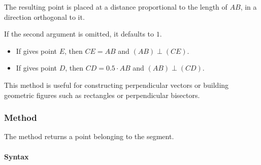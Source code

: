 The resulting point is placed at a distance proportional to the length of $AB$, in a direction orthogonal to it.

\medskip
\noindent
If the second argument  is omitted, it defaults to $1$.

\medskip
\noindent
{}
\begin{itemize}
  \item If  gives point $E$, then $CE = AB$ and $(AB) \perp (CE)$.
  \item If  gives point $D$, then $CD = 0.5 \cdot AB$ and $(AB) \perp (CD)$.
\end{itemize}

\noindent
This method is useful for constructing perpendicular vectors or building geometric figures such as rectangles or perpendicular bisectors.

\vspace{1em}
\begin{minipage}{.5\textwidth}
\begin{center}
\end{center}
\end{minipage}
\begin{minipage}{.5\textwidth}
\begin{tkzexample}
\end{tkzexample}
\end{minipage}

\subsubsection{Method }
\label{ssub:method_line_random}
The method returns a point belonging to the segment.

\paragraph*{Syntax}

